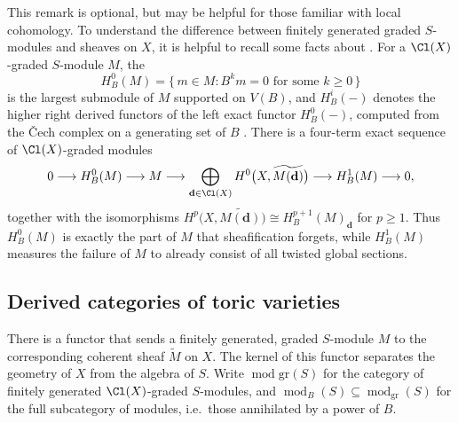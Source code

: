 \documentclass{amsart}
\begin{document}
\begin{remark}\label{rem:localcohomology}
  This remark is optional, but may be helpful for those familiar with local cohomology.  To understand the difference between finitely generated graded $S$-modules and sheaves on $X$, it is helpful to recall some facts about .
  For a $\Cl(X)$-graded $S$-module $M$, the 
  \[ H^0_B(M) = \{\,m\in M : B^k m = 0 \text{ for some } k\ge 0\,\} \]
  is the largest submodule of $M$ supported on $V(B)$, and $H^i_B(-)$ denotes the higher right derived functors of the left exact functor $H^0_B(-)$, computed from the \v{C}ech complex on a generating set of $B$ \cite[\S9]{CLS2011}.
  There is a four-term exact sequence of $\Cl(X)$-graded modules
 \[
  0 \longrightarrow H^0_B(M) \longrightarrow M \longrightarrow \bigoplus_{\mathbf d\in\Cl(X)} H^0\bigl(X,\widetilde{M(\mathbf d)}\bigr)\longrightarrow H^1_B(M) \longrightarrow 0,
  \]
  together with the isomorphisms $H^p\bigl(X,\widetilde{M(\mathbf d)}\bigr) \cong H^{p+1}_B(M)_{\mathbf d}$ for $p\ge 1$. Thus $H^0_B(M)$ is exactly the part of $M$ that sheafification forgets, while $H^1_B(M)$ measures the failure of $M$ to already consist of all twisted global sections.

\end{remark}



\subsection{Derived categories of toric varieties}
There is a functor that sends a finitely generated, graded $S$-module $M$ to the corresponding coherent sheaf $\widetilde{M}$ on $X$.  The kernel of this functor separates the geometry of $X$ from the algebra of $S$. Write $\operatorname{mod}{\mathrm{gr}}(S)$ for the category of finitely generated $\Cl(X)$-graded $S$-modules, and $\operatorname{mod}_B(S)\subseteq\operatorname{mod}_{\mathrm{gr}}(S)$ for the full subcategory of  modules, i.e.\ those annihilated by a power of $B$.
\end{document}
